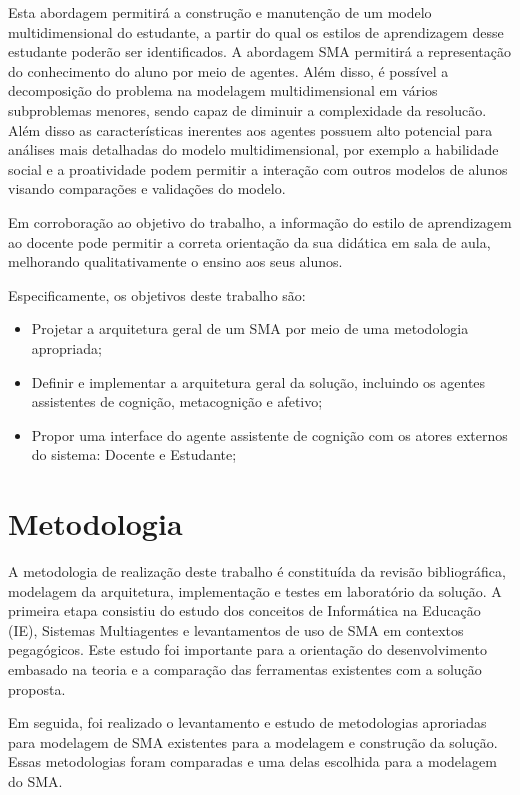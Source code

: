 Esta abordagem permitirá a construção e manutenção de um modelo multidimensional do estudante, a partir do qual os estilos de aprendizagem desse estudante poderão ser identificados. A abordagem SMA permitirá a representação do conhecimento do aluno por meio de agentes. Além disso, é possível a decomposição do problema na modelagem multidimensional em vários subproblemas menores, sendo capaz de diminuir a complexidade da resolucão. Além disso as características inerentes aos agentes possuem alto potencial para análises mais detalhadas do modelo multidimensional, por exemplo a habilidade social e a proatividade podem permitir a interação com outros modelos de alunos visando comparações e validações do modelo.

Em corroboração ao objetivo do trabalho, a informação do estilo de aprendizagem ao docente pode permitir a correta orientação da sua didática em sala de aula, melhorando qualitativamente o ensino aos seus alunos.

Especificamente, os objetivos deste trabalho são:
\begin{itemize}
 	\item Projetar a arquitetura geral de um SMA por meio de uma metodologia apropriada;
	\item Definir e implementar a arquitetura geral da solução, incluindo os agentes assistentes de cognição, metacognição e afetivo;
	\item Propor uma interface do agente assistente de cognição com os atores externos do sistema: Docente e Estudante;
\end{itemize}

\section{Metodologia}

A metodologia de realização deste trabalho é constituída da revisão bibliográfica, modelagem da arquitetura, implementação e testes em laboratório da solução. A primeira etapa consistiu do estudo dos conceitos de Informática na Educação (IE), Sistemas Multiagentes e levantamentos de uso de SMA em contextos pegagógicos. Este estudo foi importante para a orientação do desenvolvimento embasado na teoria e a comparação das ferramentas existentes com a solução proposta.

Em seguida, foi realizado o levantamento e estudo de metodologias aproriadas para modelagem de SMA existentes para a modelagem e construção da solução. Essas metodologias foram comparadas e uma delas escolhida para a modelagem do SMA.

